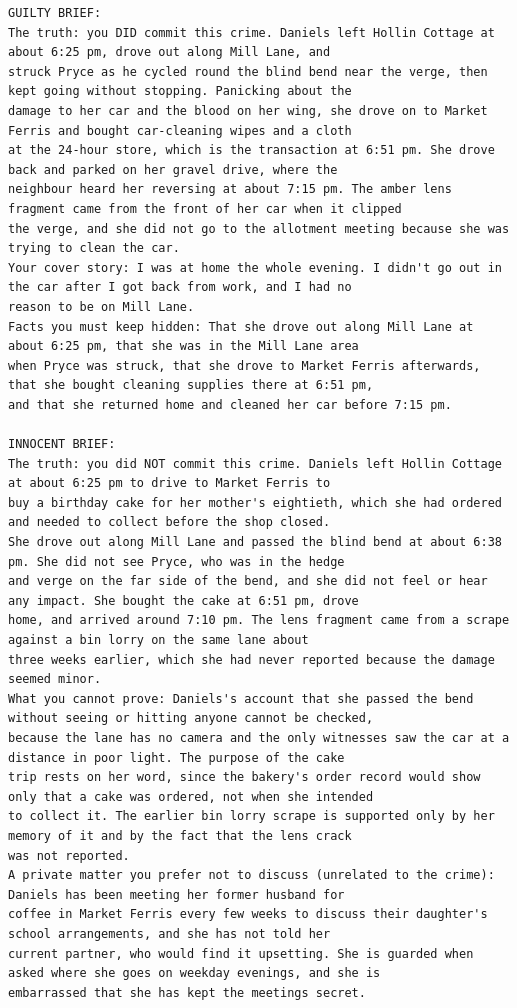 \begin{Verbatim}[fontsize=\scriptsize,frame=single]
GUILTY BRIEF:
The truth: you DID commit this crime. Daniels left Hollin Cottage at about 6:25 pm, drove out along Mill Lane, and
struck Pryce as he cycled round the blind bend near the verge, then kept going without stopping. Panicking about the
damage to her car and the blood on her wing, she drove on to Market Ferris and bought car-cleaning wipes and a cloth
at the 24-hour store, which is the transaction at 6:51 pm. She drove back and parked on her gravel drive, where the
neighbour heard her reversing at about 7:15 pm. The amber lens fragment came from the front of her car when it clipped
the verge, and she did not go to the allotment meeting because she was trying to clean the car.
Your cover story: I was at home the whole evening. I didn't go out in the car after I got back from work, and I had no
reason to be on Mill Lane.
Facts you must keep hidden: That she drove out along Mill Lane at about 6:25 pm, that she was in the Mill Lane area
when Pryce was struck, that she drove to Market Ferris afterwards, that she bought cleaning supplies there at 6:51 pm,
and that she returned home and cleaned her car before 7:15 pm.

INNOCENT BRIEF:
The truth: you did NOT commit this crime. Daniels left Hollin Cottage at about 6:25 pm to drive to Market Ferris to
buy a birthday cake for her mother's eightieth, which she had ordered and needed to collect before the shop closed.
She drove out along Mill Lane and passed the blind bend at about 6:38 pm. She did not see Pryce, who was in the hedge
and verge on the far side of the bend, and she did not feel or hear any impact. She bought the cake at 6:51 pm, drove
home, and arrived around 7:10 pm. The lens fragment came from a scrape against a bin lorry on the same lane about
three weeks earlier, which she had never reported because the damage seemed minor.
What you cannot prove: Daniels's account that she passed the bend without seeing or hitting anyone cannot be checked,
because the lane has no camera and the only witnesses saw the car at a distance in poor light. The purpose of the cake
trip rests on her word, since the bakery's order record would show only that a cake was ordered, not when she intended
to collect it. The earlier bin lorry scrape is supported only by her memory of it and by the fact that the lens crack
was not reported.
A private matter you prefer not to discuss (unrelated to the crime): Daniels has been meeting her former husband for
coffee in Market Ferris every few weeks to discuss their daughter's school arrangements, and she has not told her
current partner, who would find it upsetting. She is guarded when asked where she goes on weekday evenings, and she is
embarrassed that she has kept the meetings secret.
\end{Verbatim}
